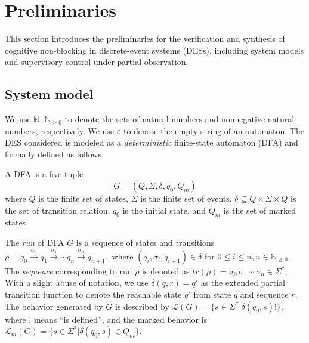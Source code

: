\documentclass[journal,twoside,web]{ieeecolor}
\begin{document}
\section{Preliminaries}\label{sec:prelimi}

This section introduces the preliminaries for the verification and synthesis of cognitive non-blocking in discrete-event systems (DESs), including system models and supervisory control under partial observation.


\subsection{System model}

We use $\mathbb{N}$, $\mathbb{N}_{\geq 0}$ to denote the sets of natural numbers and nonnegative natural numbers, respectively. 
We use $\varepsilon$ to denote the empty string of an automaton. 
%
The DES considered is modeled as a \emph{deterministic} finite-state automaton (DFA) and formally defined as follows.
\begin{definition}
    A DFA is a five-tuple
    $$
        G = (Q, \Sigma, \delta, q_0, Q_m)
    $$
    where
    $Q$ is the finite set of states, 
    $\Sigma$ is the finite set of events, 
    $\delta \subseteq Q \times \Sigma \times Q$ is the set of transition relation,
    $q_0$ is the initial state, 
    and $Q_m$ is the set of marked states.
    \label{def:DFA}
\end{definition}
%
The \emph{run} of DFA $G$ is a sequence of states and transitions
$
\rho = q_0 \xrightarrow[]{\sigma_0} q_1 \xrightarrow[]{\sigma_1} \cdots q_n \xrightarrow[]{\sigma_n} q_{n+1},
$
where $(q_{i}, \sigma_i, q_{i+1}) \in \delta$ for $0 \leq i \leq n, n \in \mathbb{N}_{\geq 0}$.
The \emph{sequence} corresponding to run $\rho$ is denoted as
$tr(\rho) = \sigma_0 \, \sigma_1 \, \cdots \, \sigma_n \in \Sigma^*$,
%
With a slight abuse of notation, we use $\delta(q, r) = q'$ as the extended partial transition function to denote the reachable state $q'$ from state $q$ and sequence $r$.
%
The behavior generated by $G$ is described by 
$\mathcal{L}(G) = \{ s \in \Sigma^* | \delta(q_0, s)! \}$, 
where $!$ means ``is defined'', and the marked behavior is 
$\mathcal{L}_m(G) = \{ s \in \Sigma^* | \delta(q_0, s) \in Q_m \}$. 
\end{document}
